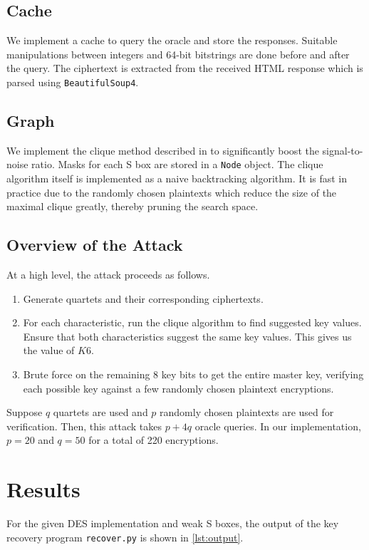 \documentclass[journal,12pt,twocolumn]{IEEEtran}
\begin{document}
\subsection{Cache}
\label{subsec:cache}

We implement a cache to query the oracle and store the responses. Suitable
manipulations between integers and 64-bit bitstrings are done before and after
the query. The ciphertext is extracted from the received HTML response which is
parsed using \texttt{BeautifulSoup4}.

\subsection{Graph}
\label{subsec:graph}

We implement the clique method described in
\cite{bihamDifferentialCryptanalysisDESlike1991} to significantly boost the
signal-to-noise ratio. Masks for each S box are stored in a \texttt{Node}
object. The clique algorithm itself is implemented as a naive backtracking
algorithm. It is fast in practice due to the randomly chosen plaintexts which
reduce the size of the maximal clique greatly, thereby pruning the search space.

\subsection{Overview of the Attack}
\label{subsec:summary}

At a high level, the attack proceeds as follows.

\begin{enumerate}
    \item Generate quartets and their corresponding ciphertexts.
    \item For each characteristic, run the clique algorithm to find suggested
    key values. Ensure that both characteristics suggest the same key values.
    This gives us the value of \(K6\).
    \item Brute force on the remaining 8 key bits to get the entire master key,
    verifying each possible key against a few randomly chosen plaintext
    encryptions.
\end{enumerate}

Suppose \(q\) quartets are used and \(p\) randomly chosen plaintexts are used
for verification. Then, this attack takes \(p + 4q\) oracle queries. In our
implementation, \(p = 20\) and \(q = 50\) for a total of 220 encryptions.

\section{Results}
\label{sec:results}

For the given DES implementation and weak S boxes, the output of the key
recovery program \texttt{recover.py} is shown in \autoref{lst:output}.



\end{document}
